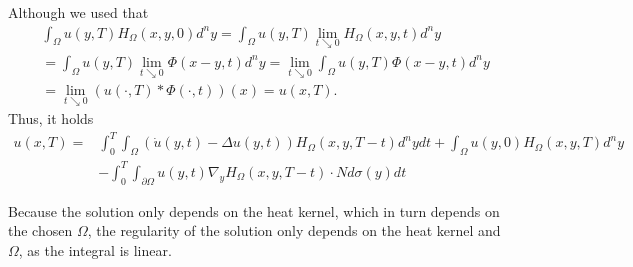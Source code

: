 \documentclass[A4,12pt,twoside]{book}
\begin{document}
Although we used that 
\begin{align*}
    &\int_\Omega u(y,T) H_\Omega (x,y,0) d^n y = \int_\Omega u(y,T) \lim_{t \searrow 0} H_\Omega (x,y,t) d^n y\\
    &=\int_\Omega u(y,T) \lim_{t \searrow 0} \Phi (x-y,t) d^n y= \lim_{t \searrow 0} \int_\Omega u(y,T)  \Phi (x-y,t) d^n y \\
    &= \lim_{t \searrow 0} (u(\cdot,T) *  \Phi (\cdot,t))(x) = u(x,T).
\end{align*}
Thus, it holds 
\begin{align*}
    u(x,T)= &\int_0^T \int_\Omega \left( \dot{u}(y,t) - \Delta u(y,t) \right) H_\Omega (x,y,T-t) d^n y dt +\int_\Omega u(y,0) H_\Omega (x,y,T) d^n y \\
    &-\int_0^T \int_{\partial \Omega}  u(y,t) \nabla_y H_\Omega (x,y,T-t)  \cdot N d \sigma (y) dt 
\end{align*}

Because the solution only depends on the heat kernel, which in turn depends on the chosen $\Omega$, the regularity of the solution only depends on the heat kernel and $\Omega$, as the integral is linear.
\end{document}
